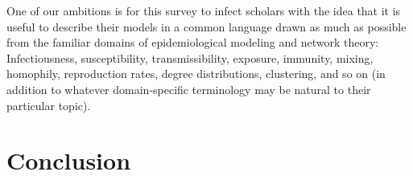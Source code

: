 
One of our ambitions is for this survey to infect scholars with the idea that it is useful to describe their models in a common language drawn as much as possible from the familiar domains of epidemiological modeling and network theory:  Infectiousness, susceptibility, transmissibility, exposure, immunity, mixing, homophily, reproduction rates, degree distributions, clustering, and so on (in addition to whatever domain-specific terminology may be natural to their particular topic).

\hypertarget{conclusion}{}
\section{Conclusion}



\ifInBook{
  
  \pagebreak
  
}{
  \pagebreak
}
% 

\pagebreak

